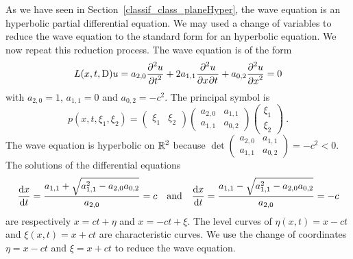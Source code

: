 As we have seen in Section~\ref{classif_class_planeHyper}, the wave equation
is an hyperbolic partial differential equation.  We may used a change
of variables to reduce the wave equation to the standard form for an
hyperbolic equation.  We now repeat this reduction process.  The wave
equation is of the form
\[
L(x,t,\diff)u = a_{2,0} \pdydxn{u}{t}{2} + 2 a_{1,1} \pdydxnm{u}{x}{t}{2}{}{} +
a_{0,2} \pdydxn{u}{x}{2} = 0
\]
with $a_{2,0} = 1$, $a_{1,1} = 0$ and $\displaystyle a_{0,2}=-c^2$.
The principal symbol is
\[
p(x,t, \xi_1, \xi_2) =
\begin{pmatrix}
\xi_1 & \xi_2
\end{pmatrix}
\begin{pmatrix}
a_{2,0} & a_{1,1} \\
a_{1,1} & a_{0,2}
\end{pmatrix}
\begin{pmatrix}
\xi_1 \\ \xi_2
\end{pmatrix} \ .
\]
The wave equation is hyperbolic on $\displaystyle \RR^2$ because
$\displaystyle \det
\begin{pmatrix}
a_{2,0} & a_{1,1} \\
a_{1,1} & a_{0,2}
\end{pmatrix} = -c^2 < 0$.
The solutions of the differential equations
\[
\dydx{x}{t} = \frac{a_{1,1} + \sqrt{a_{1,1}^2 - a_{2,0} a_{0,2}}}{a_{2,0}} = c
\quad \text{and} \quad
\dydx{x}{t} = \frac{a_{1,1} - \sqrt{a_{1,1}^2 - a_{2,0} a_{0,2}}}{a_{2,0}} =-c
\]
are respectively $x=ct+\eta$ and $x=-ct+\xi$.  The level curves of
$\eta(x,t) = x-ct$ and $\xi(x,t) = x +ct$ are characteristic curves.  We use
the change of coordinates $\eta = x-ct$ and $\xi = x +ct$ to reduce the
wave equation.

